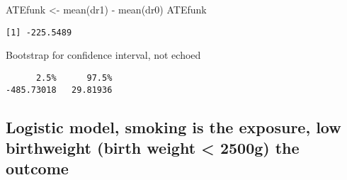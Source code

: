 \documentclass[
  letterpaper,
  DIV=11,
  numbers=noendperiod]{scrartcl}
\newenvironment{Shaded}{\begin{snugshade}}{\end{snugshade}}
\newcommand{\FunctionTok}[1]{\textcolor[rgb]{0.28,0.35,0.67}{#1}}
\newcommand{\NormalTok}[1]{\textcolor[rgb]{0.00,0.23,0.31}{#1}}
\newcommand{\OtherTok}[1]{\textcolor[rgb]{0.00,0.23,0.31}{#1}}
\newcommand{\SpecialCharTok}[1]{\textcolor[rgb]{0.37,0.37,0.37}{#1}}
\begin{document}
\begin{Shaded}
\begin{Highlighting}[]
\NormalTok{ATEfunk }\OtherTok{\textless{}{-}} \FunctionTok{mean}\NormalTok{(dr1) }\SpecialCharTok{{-}} \FunctionTok{mean}\NormalTok{(dr0)  }
\NormalTok{ATEfunk}
\end{Highlighting}
\end{Shaded}

\begin{verbatim}
[1] -225.5489
\end{verbatim}

Bootstrap for confidence interval, not echoed

\begin{verbatim}
      2.5%      97.5% 
-485.73018   29.81936 
\end{verbatim}

\hypertarget{logistic-model-smoking-is-the-exposure-low-birthweight-birth-weight-2500g-the-outcome}{%
\subsection{Logistic model, smoking is the exposure, low birthweight
(birth weight \textless{} 2500g) the
outcome}\label{logistic-model-smoking-is-the-exposure-low-birthweight-birth-weight-2500g-the-outcome}}
\end{document}
